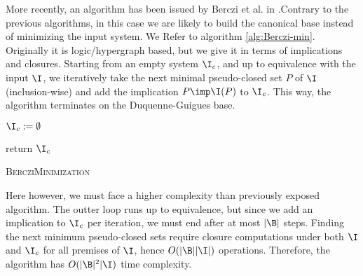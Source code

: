 \documentclass[a4paper, 10pt]{article}
\begin{document}
More recently, an algorithm has been issued by Berczi et al. in \cite{berczi_directed_2017}.Contrary to the previous algorithms, in this case 
we are likely to build the canonical base instead of minimizing the input system. We Refer to algorithm \ref{alg:Berczi-min}. Originally it is logic/hypergraph based, but we give it in terms of implications and closures. 
Starting from an empty system $\I_c$, and up to equivalence with the input $\I$, we iteratively take the next minimal pseudo-closed set $P$ of $\I$ (inclusion-wise) and add the implication $P \imp \I(P)$ to $\I_c$. This way,
the algorithm terminates on the Duquenne-Guigues base.



\begin{algorithm}
	
	\BlankLine
	\BlankLine
	
	$\I_c := \emptyset$ \;
	
	
	return $\I_c$ \;
	
	\caption{\textsc{BercziMinimization}}
	\label{alg:Berczi-min}
\end{algorithm}

Here however, we must face a higher complexity than previously exposed algorithm. The outter loop runs up to equivalence, but since we add an implication to $\I_c$ per iteration, we must end after at most $|\B|$ steps. Finding the next minimum pseudo-closed sets require closure computations under 
both $\I$ and $\I_c$ for all premises of $\I$, hence $O(|\B||\I|)$ operations. Therefore, the algorithm has $O(|\B|^2|\I)$ time complexity. 
\end{document}
